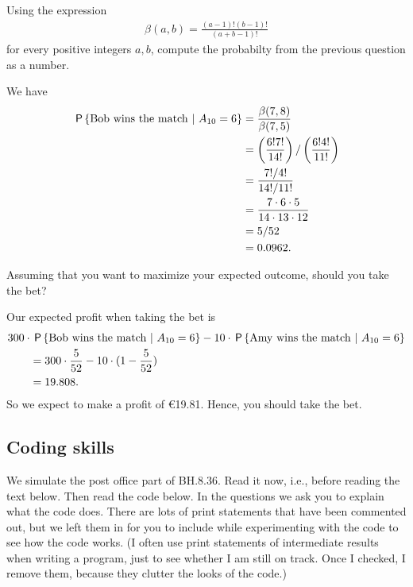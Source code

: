 \documentclass[assignments]{subfiles}
\begin{document}
\begin{exercise}
Using the expression
\begin{align}
    \beta(a,b) = \frac{(a-1)!(b-1)!}{(a+b-1)!}
\end{align}
for every positive integers $a,b$, compute the probabilty from the previous question as a number.
\begin{solution}
We have
\begin{align}
    \P{ \text{Bob wins the match} \ | \ A_{10} = 6 } &= \frac{\beta(7,8)}{\beta(7,5)} \\
    &= \left(\frac{6!7!}{14!}\right)/\left(\frac{6!4!}{11!}\right) \\
    &= \frac{7!/4!}{14!/11!} \\
    &= \frac{7\cdot 6 \cdot 5}{14 \cdot 13 \cdot 12} \\
    &= 5/52 \\
    &= 0.0962.
\end{align}
\end{solution}
\end{exercise}

\begin{exercise}
Assuming that you want to maximize your expected outcome, should you take the bet?
\begin{solution}
Our expected profit when taking the bet is
\begin{align}
    &300 \cdot \P{ \text{Bob wins the match} \ | \ A_{10} = 6 } - 10 \cdot \P{ \text{Amy wins the match} \ | \ A_{10} = 6 } \\
    &\qquad= 300 \cdot \frac{5}{52} - 10 \cdot (1 - \frac{5}{52}) \\
    &\qquad= 19.808.
\end{align}
So we expect to make a profit of €19.81. Hence, you should take the bet.
\end{solution}
\end{exercise}





\subsection{Coding skills}
\label{sec:coding-skills-1}

We simulate the post office part of BH.8.36.
Read it now, i.e., before reading the text below.
Then read the code below.
In the questions we ask you to explain what the code does.
There are lots of print statements that have been commented out, but we left them in for you to include while experimenting with the code to see how the code works.
(I often use print statements of intermediate results when writing a program, just to see whether I am still on track.
Once I checked, I remove them, because they clutter the looks of the code.)
\end{document}
